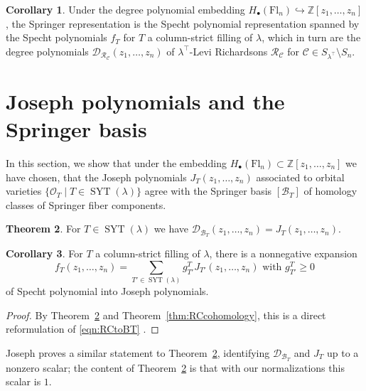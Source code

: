 \documentclass[11pt]{amsart}
\theoremstyle{definition}
\newtheorem{thm}{Theorem}[section]
\newtheorem{cor}[thm]{Corollary}
\numberwithin{equation}{section}
\newcommand{\suchthat}{\;|\;}
\newcommand{\fl}[1]{\mathrm{Fl}_{#1}}
\newcommand{\syt}{\operatorname{SYT}} %
\begin{document}
\begin{cor}
Under the degree polynomial embedding
    $H_\bullet(\fl{n})\hookrightarrow \mathbb{Z}[z_1,\ldots,z_n]$, the Springer representation is the Specht polynomial representation spanned by the Specht polynomials $f_T$ for $T$ a column-strict filling of $\lambda$, which in turn are the degree polynomials $\mathcal{D}_{\mathcal{R}_{\mathcal{C}}}(z_1,\ldots,z_n)$ of $\lambda^{\top}$-Levi Richardsons $\mathcal{R}_{\mathcal{C}}$ for $\mathcal{C}\in S_{\lambda^{\top}}\setminus S_n$.
\end{cor}

\section{Joseph polynomials and the Springer basis}
\label{sec:Joseph}

In this section, we show that under the embedding $H_\bullet(\fl{n})\subset \mathbb{Z}[z_1,\ldots,z_n]$ we have chosen, that the Joseph polynomials $J_T(z_1,\ldots,z_n)$ associated to orbital varieties $\{\mathcal{O}_T\suchthat T\in \syt(\lambda)\}$ agree with the Springer basis $[\mathcal{B}_T]$ of homology classes of Springer fiber components.
\begin{thm}
\label{thm:JTBT}
For $T\in \syt(\lambda)$ we have $\mathcal{D}_{\mathcal{B}_T}(z_1,\ldots,z_n)=J_T(z_1,\ldots,z_n)$.
\end{thm}
\begin{cor}
\label{cor:SpechtintoJoseph}
    For $T$ a column-strict filling of $\lambda$, there is a nonnegative expansion
    $$f_T(z_1,\ldots,z_n)=\sum_{T'\in \syt(\lambda)} g^T_{T'}J_{T'}(z_1,\ldots,z_n)\text{ with }g^T_{T'}\ge 0$$
    of Specht polynomial into Joseph polynomials.
\end{cor}
\begin{proof}
    By Theorem~\ref{thm:JTBT} and Theorem~\ref{thm:RCcohomology}, this is a direct reformulation of \eqref{eqn:RCtoBT} .
\end{proof}
Joseph \cite[\S 2]{Jo89} proves a similar statement to Theorem~\ref{thm:JTBT}, identifying $\mathcal{D}_{\mathcal{B}_T}$ and $J_T$ up to a nonzero scalar; the content of Theorem~\ref{thm:JTBT} is that with our normalizations this scalar is $1$.
\end{document}
